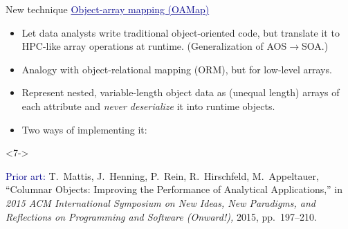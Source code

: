 \documentclass[aspectratio=169]{beamer}
\begin{document}
\begin{frame}{New technique}
\vspace{0.35 cm}
\textcolor{darkblue}{\large \underline{Object-array mapping (OAMap)}}

\vspace{0.15 cm}
\begin{itemize}\setlength{\itemsep}{0.15 cm}
\item Let data analysts write traditional object-oriented code, but translate it to HPC-like array operations at runtime. (Generalization of AOS$\to$SOA.)
\item<2-> Analogy with object-relational mapping (ORM), but for low-level arrays.
\item<3-> Represent nested, variable-length object data as (unequal length) arrays of each attribute and {\it never deserialize} it into runtime objects.
\item<4-> Two ways of implementing it:

\vspace{0.05 cm}
\end{itemize}

\vspace{0.2 cm}
\begin{uncoverenv}<7->
\begin{minipage}{\linewidth}
\scriptsize \textcolor{darkblue}{Prior art:} T.\ Mattis, J.\ Henning, P.\ Rein, R.\ Hirschfeld, M.\ Appeltauer, ``Columnar Objects: Improving the Performance of Analytical Applications,'' in {\it 2015 ACM International Symposium on New Ideas, New Paradigms, and Reflections on Programming and Software (Onward!),} 2015, pp.\ 197--210.
\end{minipage}
\end{uncoverenv}
\end{frame}
\end{document}
